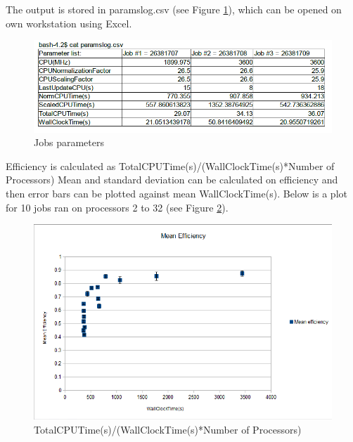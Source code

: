 \documentclass[english]{article}
\begin{document}
The output is stored in paramslog.csv (see Figure \ref{fig:param}), which can be opened on own workstation using Excel.
  \begin{figure}[h]
    \includegraphics[scale=0.5]{table.png}
\caption{Jobs parameters}
\label{fig:param}
\end{figure}


Efficiency is calculated as TotalCPUTime(s)/(WallClockTime(s)*Number of Processors)
Mean and standard deviation can be calculated on efficiency and then error bars can be plotted
against mean WallClockTime(s). Below is a plot for 10 jobs ran on processors 2 to 32 (see Figure \ref{fig:meaneff}).

\begin{figure}[h]
    \includegraphics[scale=0.5]{1252meaneff.png}
\caption{TotalCPUTime(s)/(WallClockTime(s)*Number of Processors)}
\label{fig:meaneff}
\end{figure}
\end{document}
